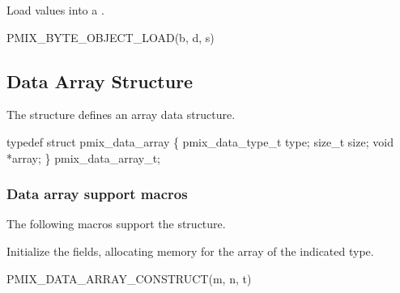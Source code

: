 \begin{arglist}
\end{arglist}


Load values into a .

\cspecificstart
\begin{codepar}
PMIX_BYTE_OBJECT_LOAD(b, d, s)
\end{codepar}
\cspecificend

\begin{arglist}
\end{arglist}


\subsection{Data Array Structure}

The  structure defines an array data structure.

\cspecificstart
\begin{codepar}
typedef struct pmix_data_array \{
    pmix_data_type_t type;
    size_t size;
    void *array;
\} pmix_data_array_t;
\end{codepar}
\cspecificend

\subsubsection{Data array support macros}
The following macros support the  structure.


Initialize the  fields, allocating memory for the array of the indicated type.

\cspecificstart
\begin{codepar}
PMIX_DATA_ARRAY_CONSTRUCT(m, n, t)
\end{codepar}
\cspecificend

